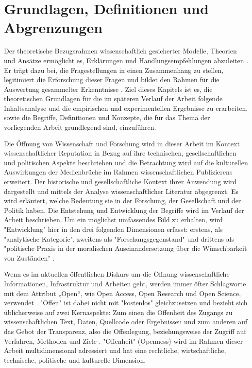 \chapter{Grundlagen, Definitionen und Abgrenzungen}

Der theoretische Bezugsrahmen wissenschaftlich gesicherter Modelle, Theorien und Ansätze ermöglicht es, Erklärungen und Handlungsempfehlungen abzuleiten \cite{martin_2007_wissenschaftstheorie}. Er trägt dazu bei, die Fragestellungen in einen Zusammenhang zu stellen, legitimiert die Erforschung dieser Fragen und bildet den Rahmen für die Auswertung gesammelter Erkenntnisse \cite{suchen}. Ziel dieses Kapitels ist es, die theoretischen Grundlagen für die im späteren Verlauf der Arbeit folgende Inhaltsanalyse und die empirischen und experimentellen Ergebnisse zu erarbeiten, sowie die Begriffe, Definitionen und Konzepte, die für das Thema der vorliegenden Arbeit grundlegend sind, einzuführen.

Die Öffnung von Wissenschaft und Forschung wird in dieser Arbeit im Kontext wissenschaftlicher Reputation in Bezug auf ihre technischen, gesellschaftlichen und politischen Aspekte beschrieben und die Betrachtung wird auf die kulturellen Auswirkungen der Medienbrüche im Rahmen wissenschaftlichen Publizierens erweitert. Der historische und gesellschaftliche Kontext ihrer Anwendung wird dargestellt und mittels der Analyse wissenschaftlicher Literatur abgegrenzt. Es wird erläutert, welche Bedeutung sie in der Forschung, der Gesellschaft und der Politik haben. Die Entstehung und Entwicklung der Begriffe wird im Verlauf der Arbeit beschrieben. Um ein möglichst umfassendes Bild zu erhalten, wird "Entwicklung" hier in den drei folgenden Dimensionen erfasst: erstens, als "analytische Kategorie", zweitens als "Forschungsgegenstand" und drittens als "politische Praxis in der moralischen Auseinandersetzung über die Wünschbarkeit von Zuständen" \cite{cite:10}.

Wenn es im aktuellen öffentlichen Diskurs um die Öffnung wissenschaftliche Informationen, Infrastruktur und Arbeiten geht, werden immer öfter Schlagworte mit dem Attribut „Open“, wie Open Access, Open Research und Open Science, verwendet \cite{bunz_2014} \cite{schulze_2013_open}. "Offen" ist dabei nicht mit "kostenlos" gleichzusetzen \cite{grand_2012_open} und bezieht sich üblicherweise auf zwei Kernaspekte: Zum einen die Offenheit des Zugangs zu wissenschaftlichen Text, Daten, Quellcode oder Ergebnissen und zum anderen auf das Gebot der Transparenz, also die Offenlegung, beziehungsweise der Zugriff auf Verfahren, Methoden und Ziele \cite{schulze_2013_open}. "Offenheit" (Openness) wird im Rahmen dieser Arbeit multidimensional adressiert und hat eine rechtliche, wirtschaftliche, technische, politische und kulturelle Dimension.

